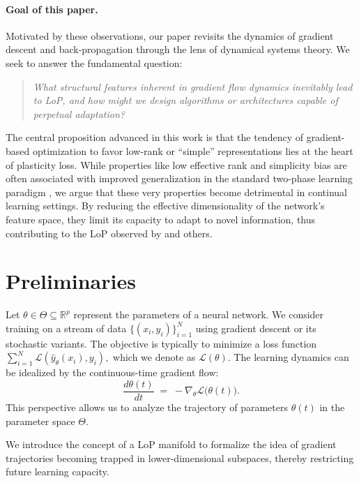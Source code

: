 \documentclass{article}
\newcommand{\Loss}{\mathcal{L}}
\newcommand{\R}{\mathbb{R}}
\begin{document}
\paragraph{Goal of this paper.}
Motivated by these observations, our paper revisits the dynamics of gradient descent and back-propagation through the lens of dynamical systems theory. We seek to answer the fundamental question:
\begin{quote}
\emph{What structural features inherent in gradient flow dynamics inevitably lead to LoP, and how might we design algorithms or architectures capable of perpetual adaptation?}
\end{quote}
The central proposition advanced in this work is that the tendency of gradient-based optimization to favor low-rank or ``simple'' representations lies at the heart of plasticity loss. While properties like low effective rank and simplicity bias are often associated with improved generalization in the standard two-phase learning paradigm \citep{huh2022lowrank, papyan2020prevalence, zhang2017understanding}, we argue that these very properties become detrimental in continual learning settings. By reducing the effective dimensionality of the network's feature space, they limit its capacity to adapt to novel information, thus contributing to the LoP observed by \citet{dohare2024loss} and others.

\section{Preliminaries}
\label{sec:preliminaries}

Let $\theta\in\Theta\subseteq\R^p$ represent the parameters of a neural network. We consider training on a stream of data $\{(x_i,y_i)\}_{i=1}^N$ using gradient descent or its stochastic variants. The objective is typically to minimize a loss function $\sum_{i=1}^N \Loss(\hat{y}_\theta(x_i),y_i),$ which we denote as $\Loss(\theta)$. The learning dynamics can be idealized by the continuous-time gradient flow:
\begin{equation}
    \frac{d\theta(t)}{dt} \;=\; -\nabla_\theta\Loss\bigl(\theta(t)\bigr).
    \label{eq:grad_flow}
\end{equation}
This perspective allows us to analyze the trajectory of parameters $\theta(t)$ in the parameter space $\Theta$.

We introduce the concept of a LoP manifold to formalize the idea of gradient trajectories becoming trapped in lower-dimensional subspaces, thereby restricting future learning capacity.
\end{document}
